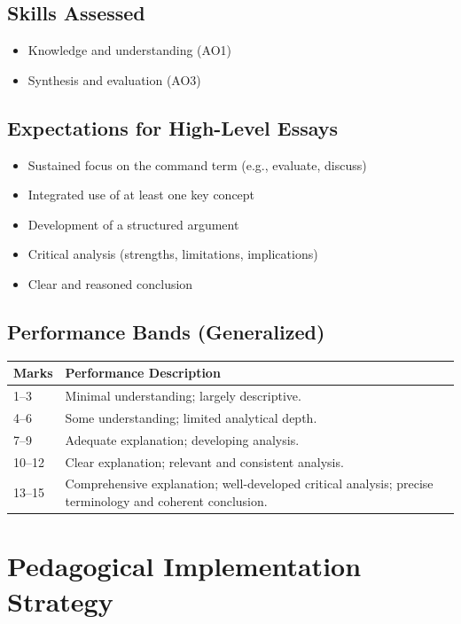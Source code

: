 \documentclass[12pt,a4paper]{article}
\begin{document}
\subsection*{Skills Assessed}
\begin{itemize}
    \item Knowledge and understanding (AO1)
    \item Synthesis and evaluation (AO3)
\end{itemize}

\subsection*{Expectations for High-Level Essays}
\begin{itemize}
    \item Sustained focus on the command term (e.g., evaluate, discuss)
    \item Integrated use of at least one key concept
    \item Development of a structured argument
    \item Critical analysis (strengths, limitations, implications)
    \item Clear and reasoned conclusion
\end{itemize}

\subsection*{Performance Bands (Generalized)}

\begin{longtable}{p{1.5cm} p{12cm}}
\toprule
\textbf{Marks} & \textbf{Performance Description} \\
\midrule
1--3 & Minimal understanding; largely descriptive. \\
4--6 & Some understanding; limited analytical depth. \\
7--9 & Adequate explanation; developing analysis. \\
10--12 & Clear explanation; relevant and consistent analysis. \\
13--15 & Comprehensive explanation; well-developed critical analysis; precise terminology and coherent conclusion. \\
\bottomrule
\end{longtable}

\newpage

\section{Pedagogical Implementation Strategy}
\end{document}
